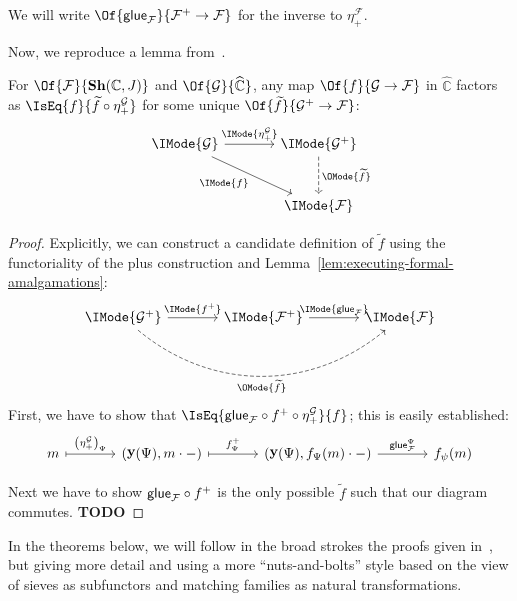 \documentclass{article}
\DeclareMathOperator\OpYoneda{\mathbf{y}}
\newcommand\Yoneda[1]{\OpYoneda({#1})}
\newcommand\Psh[1]{\widehat{#1}}
\newcommand\Sh[1]{\mathbf{Sh} (#1)}
\newcommand\Plus[1]{{#1}^+}
\begin{document}
\begin{notation}
  We will write
  $\Of{\Glue{\mathcal{F}}}{\Plus{\mathcal{F}}\to\mathcal{F}}$ for the
  inverse to $\eta_+^{\mathcal{F}}$.
\end{notation}

Now, we reproduce a lemma from~\cite{maclane-moerdijk:1992}.
\begin{lem}
  For $\Of{\mathcal{F}}{\Sh{\mathbb{C},J}}$ and
  $\Of{\mathcal{G}}{\Psh{\mathbb{C}}}$, any map
  $\Of{f}{\mathcal{G}\to\mathcal{F}}$ in $\Psh{\mathbb{C}}$ factors as
  $\IsEq{f}{\widetilde{f}\circ\eta_+^{\mathcal{G}}}$ for some unique
  $\Of{\widetilde{f}}{\Plus{\mathcal{G}}\to\mathcal{F}}$:
  \[
    \begin{tikzcd}[sep=large]
      \IMode{\mathcal{G}}
      \arrow[r,"\IMode{\eta_+^\mathcal{G}}"]
      \arrow[dr,swap,"\IMode{f}"]
      &
      \IMode{\Plus{\mathcal{G}}}
      \arrow[d,dashed,"\OMode{\widetilde{f}}"]
      \\
      &
      \IMode{\mathcal{F}}
    \end{tikzcd}
  \]
\end{lem}
\begin{proof}
  Explicitly, we can construct a candidate definition of
  $\widetilde{f}$ using the functoriality of the plus construction and
  Lemma~\ref{lem:executing-formal-amalgamations}:
  \[
    \begin{tikzcd}[sep=large]
      \IMode{\Plus{\mathcal{G}}}
      \arrow[r,"\IMode{\Plus{f}}"]
      \arrow[rr,swap,dashed,bend right=40,"\OMode{\widetilde{f}}"]
      &
      \IMode{\Plus{\mathcal{F}}}
      \arrow[r,"\IMode{\Glue{\mathcal{F}}}"]
      &
      \IMode{\mathcal{F}}
    \end{tikzcd}
  \]
%
  First, we have to show that
  $\IsEq{\Glue{\mathcal{F}}\circ\Plus{f}\circ\eta_+^{\mathcal{G}}}{f}$;
  this is easily established:
  \[
    \begin{tikzcd}[sep=large]
      m
      \arrow[r,mapsto,"\left(\eta_+^{\mathcal{G}}\right)_\Psi"]
      &
      (\Yoneda{\Psi},m\cdot-)
      \arrow[r,mapsto,"\Plus{f}_\Psi"]
      &
      (\Yoneda{\Psi},f_\Psi(m)\cdot-)
      \arrow[r,"\Glue{\mathcal{F}}^\Psi"]
      &
      f_\psi(m)
    \end{tikzcd}
  \]

  Next we have to show $\Glue{\mathcal{F}}\circ\Plus{f}$ is the only
  possible $\widetilde{f}$ such that our diagram commutes. \textbf{TODO}
\end{proof}


In the theorems below, we will follow in the broad strokes the proofs
given in~\cite{maclane-moerdijk:1992}, but giving more detail and
using a more ``nuts-and-bolts'' style based on the view of sieves as
subfunctors and matching families as natural transformations.
\end{document}
